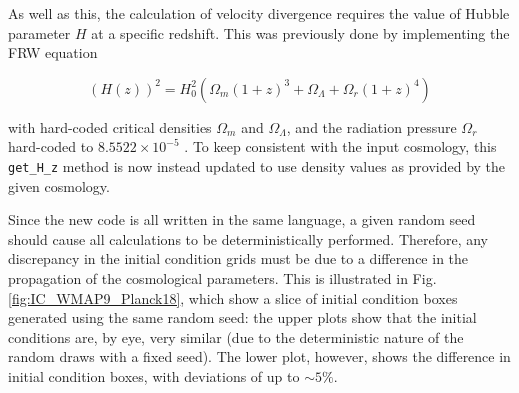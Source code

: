 \documentclass[floats,floatfix,showpacs,amssymb,prd,superscriptaddress,nofootinbib]{revtex4-2} %
\newcommand{\code}{\texttt}
\begin{document}
As well as this, the calculation of velocity divergence requires the value of Hubble parameter $H$ at a specific redshift. This was previously done by implementing the FRW equation

\begin{equation}
    (H(z))^2 = H_0^2 (\Omega_m (1 + z)^3 + \Omega_\Lambda + \Omega_r (1+z)^4)
\end{equation}

\noindent with hard-coded critical densities $\Omega_m$ and $\Omega_\Lambda$, and the radiation pressure $\Omega_r$ hard-coded to $8.5522 \times 10^{-5}$ \citep{Planck2013results}. To keep consistent with the input cosmology, this \code{get\_H\_z} method is now instead updated to use density values as provided by the given cosmology.


Since the new code is all written in the same language, a given random seed should cause all calculations to be deterministically performed. Therefore, any discrepancy in the initial condition grids must be due to a difference in the propagation of the cosmological parameters. This is illustrated in Fig. \ref{fig:IC_WMAP9_Planck18}, which show a slice of initial condition boxes generated using the same random seed: the upper plots show that the initial conditions are, by eye, very similar (due to the deterministic nature of the random draws with a fixed seed). The lower plot, however, shows the difference in initial condition boxes, with deviations of up to $\sim 5 \%$.
\end{document}
